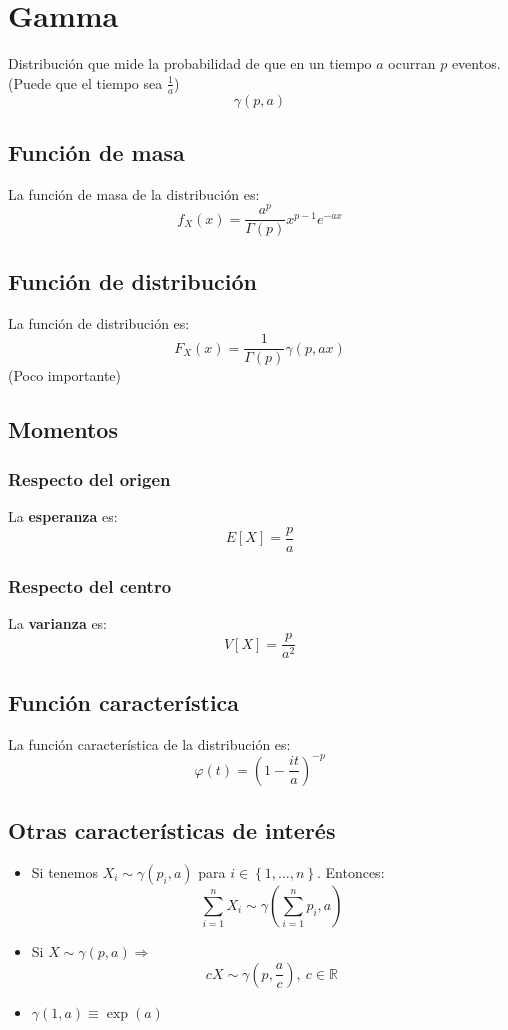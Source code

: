 \section{Gamma}
\label{sec:gamma}
Distribución que mide la probabilidad de que en un tiempo $a$ ocurran $p$ eventos. (Puede que el tiempo sea $\frac{1}{a}$)
\[
\boxed{\gamma\left( p, a \right)}
\]

\subsection{Función de masa}
La función de masa de la distribución es:
\[
f_X \left( x \right) = \frac{a^p}{\Gamma\left( p \right)} x^{p - 1} e^{-ax}
\]

\subsection{Función de distribución}
La función de distribución es:
\[
F_X\left( x \right) = \frac{1}{\Gamma\left( p \right)} \gamma\left( p, ax \right)
\]
(Poco importante)

\subsection{Momentos}

\subsubsection*{Respecto del origen}
La \textbf{esperanza} es: 
\[
    E\left[ X \right] = \frac{p}{a}
\]
\subsubsection*{Respecto del centro}
La \textbf{varianza} es:
\[
    V\left[ X \right] = \frac{p}{a^2}
\]

\subsection{Función característica}
La función característica de la distribución es:
\[
\varphi\left( t \right) = \left( 1 - \frac{it}{a} \right)^{-p}
\]

\subsection{Otras características de interés}
\begin{itemize}
    \item Si tenemos $X_i \sim \gamma\left( p_i, a \right)$ para $i \in \left\{ 1, \ldots, n \right\}$. Entonces:
    \[
    \sum_{i=1}^{n} X_i \sim \gamma\left( \sum_{i=1}^{n} p_i, a \right) 
    \]
    \item Si $X \sim \gamma\left( p, a \right) \Rightarrow$
    \[
    c X \sim \gamma\left( p, \frac{a}{c} \right),\ c \in \mathbb{R}
    \]
    \item $\gamma\left( 1, a \right) \equiv \exp\left( a \right)$
\end{itemize}
